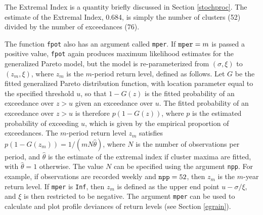 \documentclass[11pt,a4paper]{article}
\begin{document}
The Extremal Index is a quantity briefly discussed in Section \ref{stochproc}. The estimate of the Extremal Index, 0.684, is simply the number of clusters (52) divided by the number of exceedances (76). 

The function \verb+fpot+ also has an argument called \verb+mper+.
If $\verb+mper+ = m$ is passed a positive value, \verb+fpot+ again produces maximum likelihood estimates for the generalized Pareto model, but the model is re-parameterized from $(\sigma,\xi)$ to $(z_m,\xi)$, where $z_m$ is the $m$-period return level, defined as follows. 
Let $G$ be the fitted generalized Pareto distribution function, with location parameter equal to the specified threshold $u$, so that $1 - G(z)$ is the fitted probability of an exceedance over $z > u$ given an exceedance over $u$.
The fitted probability of an exceedance over $z > u$ is therefore $p(1 - G(z))$, where $p$ is the estimated probability of exceeding $u$, which is given by the empirical proportion of exceedances.
The $m$-period return level $z_m$ satisfies $p(1 - G(z_m)) = 1/(mN\hat{\theta})$, where $N$ is the number of observations per period, and $\hat{\theta}$ is the estimate of the extremal index if cluster maxima are fitted, with $\hat{\theta} = 1$ otherwise. The value $N$ can be specified using the argument \verb+npp+. For example, if observations are recorded weekly and $\verb+npp+ = 52$, then $z_m$ is the $m$-year return level.
If \verb+mper+ is \verb+Inf+, then $z_m$ is defined as the upper end point $u - \sigma/\xi$, and $\xi$ is then restricted to be negative.
The argument \verb+mper+ can be used to calculate and plot profile deviances of return levels (see Section \ref{egrain}).
\end{document}
